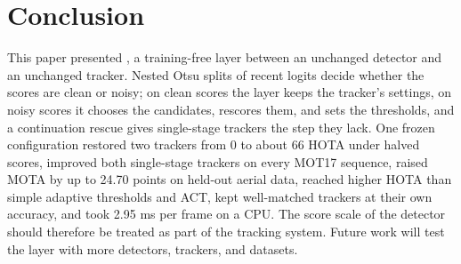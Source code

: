 \section{Conclusion}\label{sec:conclusion}

This paper presented \scl{}, a training-free layer between an unchanged detector and an unchanged
tracker. Nested Otsu splits of recent logits decide whether the scores are clean or noisy; on clean
scores the layer keeps the tracker's settings, on noisy scores it chooses the candidates, rescores
them, and sets the thresholds, and a continuation rescue gives single-stage trackers the step they
lack. One frozen configuration restored two trackers from 0 to about 66 HOTA under halved scores,
improved both single-stage trackers on every MOT17 sequence, raised MOTA by up to 24.70 points on
held-out aerial data, reached higher HOTA than simple adaptive thresholds and ACT, kept well-matched
trackers at their own accuracy, and took 2.95 ms per frame on a CPU. The score scale of the detector should therefore be treated as part of
the tracking system. Future work will test the layer with more detectors, trackers, and datasets.
